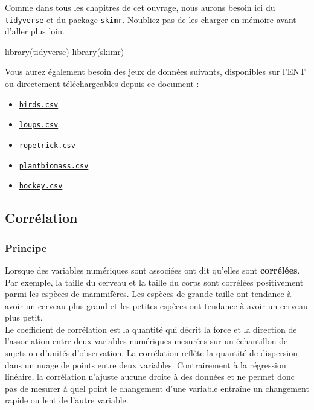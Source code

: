 \documentclass[
  a4paper,
]{article}
\newenvironment{Shaded}{\begin{snugshade}}{\end{snugshade}}
\newcommand{\FunctionTok}[1]{\textcolor[rgb]{0.39,0.29,0.61}{#1}}
\newcommand{\NormalTok}[1]{\textcolor[rgb]{0.12,0.11,0.11}{#1}}
\providecommand{\tightlist}{%
  \setlength{\itemsep}{0pt}\setlength{\parskip}{0pt}}
\begin{document}
Comme dans tous les chapitres de cet ouvrage, nous aurons besoin ici du \texttt{tidyverse} et du package \texttt{skimr}. Noubliez pas de les charger en mémoire avant d'aller plus loin.

\begin{Shaded}
\begin{Highlighting}[]
\FunctionTok{library}\NormalTok{(tidyverse)}
\FunctionTok{library}\NormalTok{(skimr)}
\end{Highlighting}
\end{Shaded}

Vous aurez également besoin des jeux de données suivants, disponibles sur l'ENT ou directement téléchargeables depuis ce document :

\begin{itemize}
\tightlist
\item
  \href{https://besibo.github.io/Biometrie3/data/birds.csv}{\texttt{birds.csv}}
\item
  \href{https://besibo.github.io/Biometrie3/data/loups.csv}{\texttt{loups.csv}}
\item
  \href{https://besibo.github.io/Biometrie3/data/ropetrick.csv}{\texttt{ropetrick.csv}}
\item
  \href{https://besibo.github.io/Biometrie3/data/plantbiomass.csv}{\texttt{plantbiomass.csv}}
\item
  \href{https://besibo.github.io/Biometrie3/data/hockey.csv}{\texttt{hockey.csv}}
\end{itemize}

\hypertarget{corruxe9lation}{%
\subsection{Corrélation}\label{corruxe9lation}}

\hypertarget{principe-1}{%
\subsubsection{Principe}\label{principe-1}}

Lorsque des variables numériques sont associées ont dit qu'elles sont \textbf{corrélées}. Par exemple, la taille du cerveau et la taille du corps sont corrélées positivement parmi les espèces de mammifères. Les espèces de grande taille ont tendance à avoir un cerveau plus grand et les petites espèces ont tendance à avoir un cerveau plus petit.\\
Le coefficient de corrélation est la quantité qui décrit la force et la direction de l'association entre deux variables numériques mesurées sur un échantillon de sujets ou d'unités d'observation. La corrélation reflète la quantité de dispersion dans un nuage de points entre deux variables. Contrairement à la régression linéaire, la corrélation n'ajuste aucune droite à des données et ne permet donc pas de mesurer à quel point le changement d'une variable entraîne un changement rapide ou lent de l'autre variable.
\end{document}
